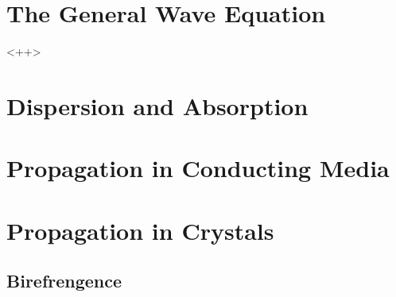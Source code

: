 \documentclass[../electromagnetism.tex]{subfiles}
\begin{document}
\section{The General Wave Equation}
<++>
\section{Dispersion and Absorption}
\section{Propagation in Conducting Media}
\section{Propagation in Crystals}
\subsection{Birefrengence}
\end{document}
